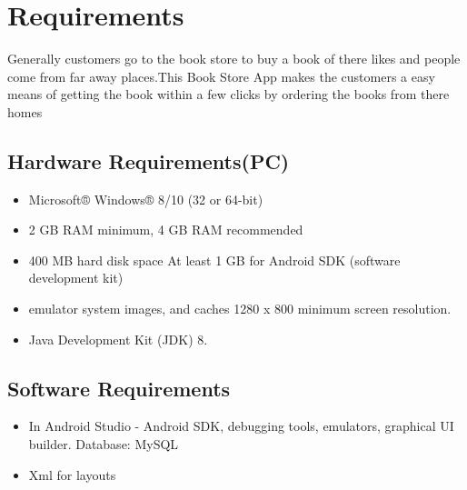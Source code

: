 \chapter{Requirements}

Generally customers go to the book store to buy a book of there likes and people come from far away places.This Book Store App makes the customers a easy means of getting the book within a few clicks by ordering the books from there homes

\section{Hardware Requirements(PC)}
\begin{itemize}
\item Microsoft® Windows® 8/10 (32 or 64-bit)
\item 2 GB RAM minimum, 4 GB RAM recommended
\item 400 MB hard disk space At least 1 GB for Android SDK (software development kit)
\item emulator system images, and caches 1280 x 800 minimum screen resolution.
\item Java Development Kit (JDK) 8.
\end{itemize}

\section{Software Requirements}
\begin{center}
\begin{itemize}
    \item In Android Studio - Android SDK, 
       debugging tools, 
       emulators, 
       graphical UI builder. 
       Database: MySQL
\item Xml for layouts
        
\end{itemize}
\end{center}
